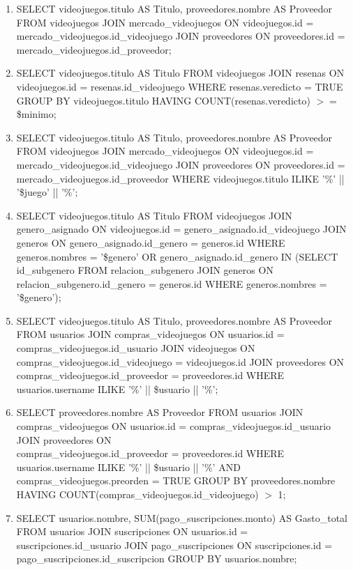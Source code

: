\documentclass[12pt]{article}
\begin{document}
\begin{enumerate}
    \item SELECT videojuegos.titulo AS Titulo, proveedores.nombre AS Proveedor FROM videojuegos JOIN mercado\_videojuegos ON videojuegos.id = mercado\_videojuegos.id\_videojuego JOIN proveedores ON proveedores.id = mercado\_videojuegos.id\_proveedor;

    \item SELECT videojuegos.titulo AS Titulo FROM videojuegos JOIN resenas ON videojuegos.id = resenas.id\_videojuego WHERE resenas.veredicto = TRUE GROUP BY videojuegos.titulo HAVING COUNT(resenas.veredicto) $>=$ \$minimo;

    \item SELECT videojuegos.titulo AS Titulo, proveedores.nombre AS Proveedor FROM videojuegos JOIN mercado\_videojuegos ON videojuegos.id = mercado\_videojuegos.id\_videojuego JOIN proveedores ON proveedores.id = mercado\_videojuegos.id\_proveedor WHERE videojuegos.titulo ILIKE '\%' || '\$juego' || '\%';

    \item SELECT videojuegos.titulo AS Titulo FROM videojuegos JOIN genero\_asignado ON videojuegos.id = genero\_asignado.id\_videojuego JOIN generos ON genero\_asignado.id\_genero = generos.id WHERE generos.nombres = '\$genero' OR genero\_asignado.id\_genero IN (SELECT id\_subgenero FROM relacion\_subgenero JOIN generos ON relacion\_subgenero.id\_genero = generos.id WHERE generos.nombres = '\$genero');
    
    \item SELECT videojuegos.titulo AS Titulo, proveedores.nombre AS Proveedor FROM usuarios JOIN compras\_videojuegos ON usuarios.id = compras\_videojuegos.id\_usuario JOIN videojuegos ON compras\_videojuegos.id\_videojuego = videojuegos.id JOIN proveedores ON compras\_videojuegos.id\_proveedor = proveedores.id WHERE usuarios.username ILIKE '\%' || \$usuario || '\%';
    
    \item SELECT proveedores.nombre AS Proveedor FROM usuarios JOIN compras\_videojuegos ON usuarios.id = compras\_videojuegos.id\_usuario JOIN proveedores ON \\compras\_videojuegos.id\_proveedor = proveedores.id WHERE usuarios.username ILIKE '\%' || \$usuario || '\%' AND compras\_videojuegos.preorden = TRUE GROUP BY proveedores.nombre HAVING COUNT(compras\_videojuegos.id\_videojuego) $>$ 1;
    
    \item SELECT usuarios.nombre, SUM(pago\_suscripciones.monto) AS Gasto\_total FROM usuarios JOIN suscripciones ON usuarios.id = suscripciones.id\_usuario JOIN pago\_suscripciones ON suscripciones.id = pago\_suscripciones.id\_suscripcion GROUP BY usuarios.nombre;

\end{enumerate}
\end{document}
